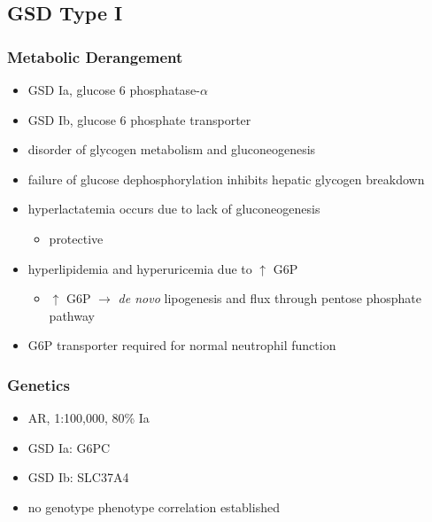 \documentclass{scrartcl}
\begin{document}
\subsection{GSD Type I}
\label{sec:orgb5dcf73}
\subsubsection{Metabolic Derangement}
\label{sec:org5c744cb}
\begin{itemize}
\item GSD Ia, glucose 6 phosphatase-\(\alpha\)
\item GSD Ib, glucose 6 phosphate transporter
\item disorder of glycogen metabolism and gluconeogenesis
\item failure of glucose dephosphorylation inhibits hepatic glycogen breakdown
\item hyperlactatemia occurs due to lack of gluconeogenesis
\begin{itemize}
\item protective
\end{itemize}
\item hyperlipidemia and hyperuricemia due to \(\uparrow\) G6P
\begin{itemize}
\item \(\uparrow\) G6P \(\to\) \emph{de novo} lipogenesis and flux through pentose phosphate pathway
\end{itemize}
\item G6P transporter required for normal neutrophil function
\end{itemize}

\subsubsection{Genetics}
\label{sec:org73d94a1}
\begin{itemize}
\item AR, 1:100,000, 80\% Ia
\item GSD Ia: G6PC
\item GSD Ib: SLC37A4
\item no genotype phenotype correlation established
\end{itemize}
\end{document}
